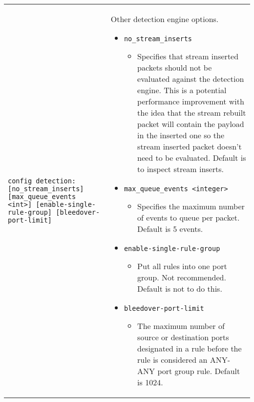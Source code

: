 \documentclass[english]{report}
\begin{document}
\begin{center}
\begin{longtable}[t]{| p{2.5in} | p{3.5in} |}
\hline
\texttt{config detection: [no\_stream\_inserts] [max\_queue\_events <int>] [enable-single-rule-group] [bleedover-port-limit]} & Other detection engine options.
\begin{itemize}
\item \texttt{no\_stream\_inserts}
\begin{itemize}
\item Specifies that stream inserted packets should not be evaluated against the detection engine.
This is a potential performance improvement with the idea that the stream rebuilt packet will
contain the payload in the inserted one so the stream inserted packet doesn't need to be
evaluated.  Default is to inspect stream inserts.
\end{itemize}
\item \texttt{max\_queue\_events <integer>}
\begin{itemize}
\item Specifies the maximum number of events to queue per packet.  Default is 5 events.
\end{itemize}
\item \texttt{enable-single-rule-group}
\begin{itemize}
\item Put all rules into one port group.  Not recommended.  Default is not to
do this.
\end{itemize}
\item \texttt{bleedover-port-limit}
\begin{itemize}
\item The maximum number of source or destination ports designated in a rule
before the rule is considered an ANY-ANY port group rule.  Default is 1024.
\end{itemize}
\end{itemize} \\


\end{longtable}
\end{center}
\end{document}
